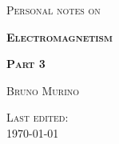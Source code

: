 \begin{titlepage}
    \begin{center}
        \vspace*{2cm}
        
        \Large
        \textsc{Personal notes on}
        
        
        \vspace{1cm}
        \Huge
        \textsc{ \textbf{Electromagnetism}}
        
        
        \vspace{0.2cm}
        \huge
        \textsc{ \textbf{Part 3}}
        
        \vspace{1cm}
        \Large
        \textsc{ Bruno Murino}
        
        \vfill
        
        \textsc{ Last edited:}\\
        \textsc{ \today}
        
    \end{center}
\end{titlepage}